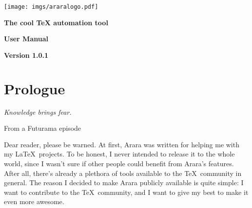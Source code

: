 \documentclass[a4paper,twoside,12pt]{memoir}
\newcommand{\araraversion}{1.0.1}
\begin{document}
\frontmatter

\begin{titlingpage}

\begin{center}
\vspace*{3em}

\texttt{[image: imgs/araralogo.pdf]}

\vspace{2em}

{\color{araracolor}\bfseries\Huge The cool \TeX{} automation tool}

\vspace{15em}

\begin{mdframed}[innertopmargin=10pt,innerbottommargin=10pt,innerleftmargin=10pt,innerrightmargin=10pt,roundcorner=5pt,linecolor=araracolor,middlelinewidth=2pt]
{\color{araracolor}\bfseries\Huge\Forward\hfill User Manual}
\end{mdframed}

\vfill

{\color{araracolor}\bfseries\LARGE Version \araraversion}

\end{center}

\end{titlingpage}

\pagestyle{araraheadings}

\chapter*{Prologue}
\label{chap:prologue}

\epigraph{\emph{Knowledge brings fear.}}{From a Futurama episode}

Dear reader, please be warned. At first, Arara was written for helping me with my \LaTeX\ projects. To be honest, I never intended to release it to the whole world, since I wasn't sure if other people could benefit from Arara's features. After all, there's already a plethora of tools available to the \TeX\ community in general. The reason I decided to make Arara publicly available is quite simple: I want to contribute to the \TeX\ community, and I want to give my best to make it even more awesome.
\end{document}
